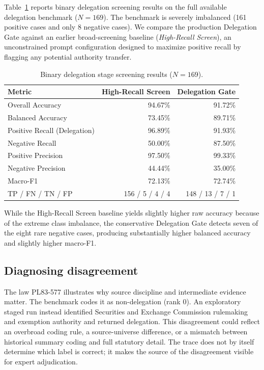 \documentclass[runningheads]{llncs}
\begin{document}
Table~\ref{tab:binary} reports binary delegation screening results on the full available delegation benchmark ($N=169$). The benchmark is severely imbalanced (161 positive cases and only 8 negative cases). We compare the production Delegation Gate against an earlier broad-screening baseline (\emph{High-Recall Screen}), an unconstrained prompt configuration designed to maximize positive recall by flagging any potential authority transfer.
 

\begin{table}[htbp]
\centering
\caption{Binary delegation stage screening results ($N=169$).}
\label{tab:binary}
\small
\begin{tabular}{@{}l@{\hspace{3pt}}rr@{}}
\toprule
\textbf{Metric} & \textbf{High-Recall Screen} & \textbf{Delegation Gate} \\
\midrule
Overall Accuracy & 94.67\% & 91.72\% \\
Balanced Accuracy & 73.45\% & 89.71\% \\
Positive Recall (Delegation) & 96.89\% & 91.93\% \\
Negative Recall & 50.00\% & 87.50\% \\
Positive Precision & 97.50\% & 99.33\% \\
Negative Precision & 44.44\% & 35.00\% \\
Macro-F1 & 72.13\% & 72.74\% \\
\midrule
TP / FN / TN / FP & 156 / 5 / 4 / 4 & 148 / 13 / 7 / 1 \\
\bottomrule
\end{tabular}
\end{table}

While the High-Recall Screen baseline yields slightly higher raw accuracy because of the extreme class imbalance, the conservative Delegation Gate detects seven of the eight rare negative cases, producing substantially higher balanced accuracy and slightly higher macro-F1.

\subsection{Diagnosing disagreement}

The law PL83-577 illustrates why source discipline and intermediate evidence matter. The benchmark codes it as non-delegation (rank 0). An exploratory staged run instead identified Securities and Exchange Commission rulemaking and exemption authority and returned delegation. This disagreement could reflect an overbroad coding rule, a source-universe difference, or a mismatch between historical summary coding and full statutory detail. The trace does not by itself determine which label is correct; it makes the source of the disagreement visible for expert adjudication.
\end{document}
